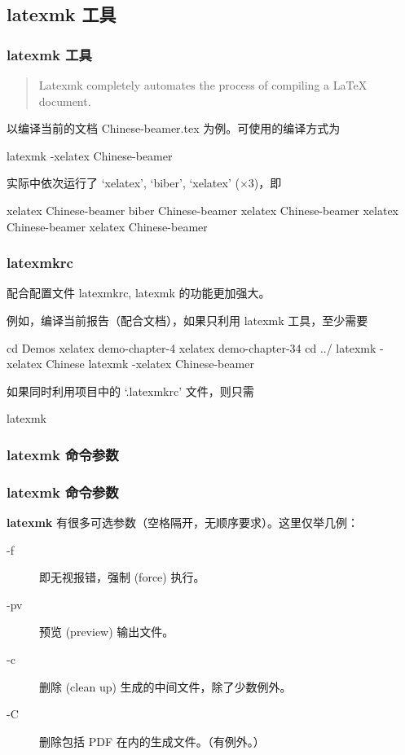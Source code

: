 \documentclass[final,aspectratio=169]{ctexbeamer}
\begin{document}
\subsection{latexmk 工具}\label{ap:latexmk}
\begin{frame}[fragile]
\frametitle{latexmk 工具}
\begin{quote}
Latexmk completely automates the process of compiling a LaTeX document.
\end{quote}
以编译当前的文档 Chinese-beamer.tex 为例。可使用的编译方式为
\begin{bashlst}
latexmk -xelatex Chinese-beamer
\end{bashlst}
实际中依次运行了 `xelatex', `biber', `xelatex' ($\times 3$)，即
\begin{bashlst}[numbers=left]
xelatex Chinese-beamer
biber Chinese-beamer
xelatex Chinese-beamer
xelatex Chinese-beamer
xelatex Chinese-beamer
\end{bashlst}
\end{frame}

\begin{frame}[fragile]
\frametitle{latexmkrc}
配合配置文件 latexmkrc, latexmk 的功能更加强大。

例如，编译当前报告（配合文档），如果只利用 latexmk 工具，至少需要
\begin{bashlst}[numbers=left]
cd Demos
xelatex demo-chapter-4
xelatex demo-chapter-34
cd ../
latexmk -xelatex Chinese
latexmk -xelatex Chinese-beamer
\end{bashlst}
如果同时利用项目中的 `.latexmkrc' 文件，则只需
\begin{bashlst}
latexmk
\end{bashlst}
\end{frame}

\subsubsection{latexmk 命令参数}
\begin{frame}
\frametitle[命令参数]{latexmk 命令参数}
\textbf{latexmk} 有很多可选参数（空格隔开，无顺序要求）。这里仅举几例：
\begin{description}
\item[-f] 即无视报错，强制 (force) 执行。
\item[-pv] 预览 (preview) 输出文件。
\item[-c] 删除 (clean up) 生成的中间文件，除了少数例外。
\item[-C] 删除包括 PDF 在内的生成文件。（有例外。）
\end{description}
\end{frame}
\end{document}
